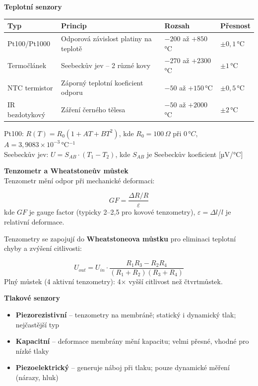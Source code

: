 \documentclass[a4paper,10pt]{article}
\begin{document}
\begin{vysvetlenibox}
\textbf{Teplotní senzory}

\begin{center}
\begin{tabularx}{0.95\linewidth}{@{} l X l l @{}}
    \toprule
    \textbf{Typ} & \textbf{Princip} & \textbf{Rozsah} & \textbf{Přesnost} \\
    \midrule
    Pt100/Pt1000 & Odporová závislost platiny na teplotě & $-200$ až $+850$\,°C & $\pm0{,}1$\,°C \\
    Termočlánek & Seebeckův jev -- 2 různé kovy & $-270$ až $+2300$\,°C & $\pm1$\,°C \\
    NTC termistor & Záporný teplotní koeficient odporu & $-50$ až $+150$\,°C & $\pm0{,}5$\,°C \\
    IR bezdotykový & Záření černého tělesa & $-50$ až $+2000$\,°C & $\pm2$\,°C \\
    \bottomrule
\end{tabularx}
\end{center}

\begin{vzorcebox}
Pt100: $R(T) = R_0 \left(1 + AT + BT^2\right)$,
kde $R_0 = 100\,\Omega$ při $0\,°C$, $A = 3{,}9083\times10^{-3}$\,°C$^{-1}$\\
Seebeckův jev: $U = S_{AB} \cdot (T_1 - T_2)$,
kde $S_{AB}$ je Seebeckův koeficient [µV/°C]
\end{vzorcebox}

\textbf{Tenzometr a Wheatstoneův můstek}\\
Tenzometr mění odpor při mechanické deformaci:

\begin{vzorcebox}
$$GF = \frac{\Delta R / R}{\varepsilon}$$
kde $GF$ je gauge factor (typicky 2--2,5 pro kovové tenzometry),
$\varepsilon = \Delta l / l$ je relativní deformace.
\end{vzorcebox}

Tenzometry se zapojují do \textbf{Wheatstoneova můstku} pro eliminaci
teplotní chyby a zvýšení citlivosti:

\begin{vzorcebox}
$$U_{out} = U_{in} \cdot \frac{R_1 R_3 - R_2 R_4}{(R_1+R_2)(R_3+R_4)}$$
Plný můstek (4 aktivní tenzometry): 4× vyšší citlivost než čtvrtmůstek.
\end{vzorcebox}

\textbf{Tlakové senzory}
\begin{itemize}[noitemsep, leftmargin=1.4em, topsep=4pt]
    \item \textbf{Piezorezistivní} -- tenzometry na membráně;
          statický i dynamický tlak; nejčastější typ
    \item \textbf{Kapacitní} -- deformace membrány mění kapacitu;
          velmi přesné, vhodné pro nízké tlaky
    \item \textbf{Piezoelektrický} -- generuje náboj při tlaku;
          pouze dynamické měření (nárazy, hluk)
\end{itemize}
\end{vysvetlenibox}
\end{document}
